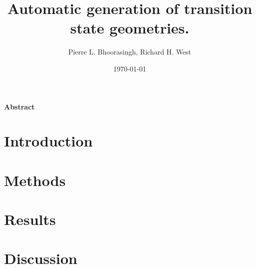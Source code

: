 \documentclass[11pt]{article}
\begin{document}
\title{Automatic generation of transition state geometries.}
\author{Pierre L. Bhoorasingh, Richard H. West}
\date{\today}
\maketitle

\newpage
\paragraph{Abstract}

\newpage
\section{Introduction}

\section{Methods}

\section{Results}

\section{Discussion}
\end{document}
